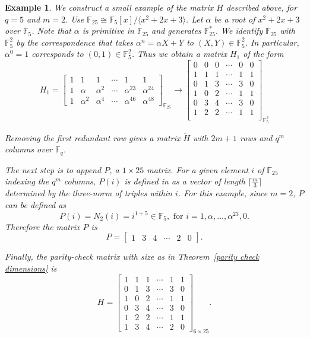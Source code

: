 \documentclass[12pt]{article}%
\newtheorem{example}[theorem]{Example}
\def\katie#1{\noindent
\textcolor{blue}
{\textsc{(Katie:}
\textsf{#1})}}
\begin{document}
\begin{example} \label{example:F25-paritycheck-matrix} 
We construct a small example of the matrix $H$ described above, for $q=5$ and $m=2$. 
Use $\mathbb{F}_{25}\cong \mathbb{F}_5[x]/\langle x^2+2x+3\rangle$. Let $\alpha$ be a root of $x^2+2x+3$ over $\mathbb{F}_5$. Note that $\alpha$ is  primitive in $\mathbb{F}_{25}$ and generates $\mathbb{F}_{25}^*$. 
We identify $\mathbb{F}_{25}$ with $\mathbb{F}_5^2$ by the correspondence that takes $\alpha^n=\alpha X+Y$ to $(X,Y)\in \mathbb{F}_5^2$. In particular, $\alpha^0=1$ corresponds to $(0,1)\in \mathbb{F}_5^2$. Thus we obtain a matrix $H_1$ of the form 
\[ H_1=\begin{bmatrix}
    1&1&1&\cdots & 1&1 \\ 
    1 & \alpha&\alpha^2&\cdots & \alpha^{23}&\alpha^{24} \\ 
    1 & \alpha^2&\alpha^4&\cdots & \alpha^{46}&\alpha^{48}
\end{bmatrix}_{\mathbb{F}_{25}}\longrightarrow  \begin{bmatrix}
    0&0&0&\cdots & 0 &0\\ 
    1&1&1&\cdots & 1 &1\\
    0 & 1&3&\cdots & 3 &0\\ 
    1 & 0&2&\cdots & 1 &1\\
    0 & 3&4&\cdots & 3 &0\\
    1 & 2&2&\cdots & 1 &1\\
\end{bmatrix}_{\mathbb{F}_5^2}
\]

Removing the first redundant row gives a matrix $\tilde{H}$ with $2m+1$ rows and $q^m$ columns over $\mathbb{F}_q$. 

The next step is to append $P$, a $1\times 25$ matrix. For a given element $i$ of $\mathbb{F}_{25}$ indexing the $q^m$ columns, $P(i)$ is defined in \cite{dumerdouble} as a vector of length $\lceil \frac{m}{3}\rceil$ determined by the three-norm of triples within $i$. For this example, since $m=2$, $P$ can be defined as 
\[ P(i)=N_2(i)=i^{1+5} \in \mathbb{F}_5, \text{ for } i=1, \alpha, \ldots, \alpha^{23},0.\]
Therefore the matrix $P$ is
\[ P=\begin{bmatrix}
    1 & 3 & 4 & \cdots & 2& 0 
\end{bmatrix}.\]

Finally, the parity-check matrix with size as in Theorem~\ref{parity check dimensions} is
\[ H=\begin{bmatrix}
    1&1&1&\cdots & 1 &1\\
    0 & 1&3&\cdots & 3 &0\\ 
    1 & 0&2&\cdots & 1 &1\\
    0 & 3&4&\cdots & 3 &0\\
    1 & 2&2&\cdots & 1 &1\\
    1 & 3 & 4 & \cdots & 2& 0 
\end{bmatrix}_{6\times 25}.\]


\end{example}
\end{document}
